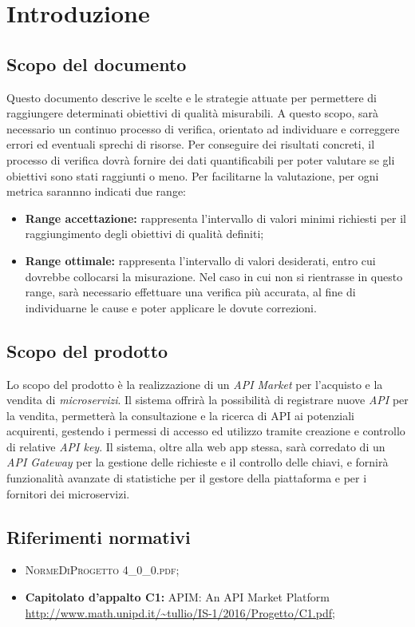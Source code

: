 \newpage
\section{Introduzione}

\subsection{Scopo del documento}
Questo documento descrive le scelte e le strategie attuate per permettere di raggiungere determinati obiettivi di qualità misurabili. A questo scopo, sarà necessario un continuo processo di verifica, orientato ad individuare e correggere errori ed eventuali sprechi di risorse.
Per conseguire dei risultati concreti, il processo di verifica dovrà fornire dei dati quantificabili per poter valutare se gli obiettivi sono stati raggiunti o meno. Per facilitarne la valutazione, per ogni metrica sarannno indicati due range:
\begin{itemize}
	\item \textbf{Range accettazione:} rappresenta l'intervallo di valori minimi richiesti per il raggiungimento degli obiettivi di qualità definiti;
	\item \textbf{Range ottimale:} rappresenta l'intervallo di valori desiderati, entro cui dovrebbe collocarsi la misurazione. Nel caso in cui non si rientrasse in questo range, sarà necessario effettuare una verifica più accurata, al fine di individuarne le cause e poter applicare le dovute correzioni.
\end{itemize}

\subsection{Scopo del prodotto}
Lo scopo del prodotto è la realizzazione di un \textit{API Market} per l'acquisto e la vendita di \textit{microservizi}. Il sistema offrirà la possibilità di registrare nuove \textit{API} per la vendita, permetterà la consultazione e la ricerca di API ai potenziali acquirenti, gestendo i permessi di accesso ed utilizzo tramite creazione e controllo di relative \textit{API key}. Il sistema, oltre alla web app stessa, sarà corredato di un \textit{API Gateway} per la gestione delle richieste e il controllo delle chiavi, e fornirà funzionalità avanzate di statistiche per il gestore della piattaforma e per i fornitori dei microservizi.

\subsection{Riferimenti normativi}
\begin{itemize}
\item \textsc{NormeDiProgetto 4\_0\_0.pdf};
\item \textbf{Capitolato d’appalto C1:} APIM: An API Market Platform\\ \url{http://www.math.unipd.it/~tullio/IS-1/2016/Progetto/C1.pdf};
\end{itemize}

